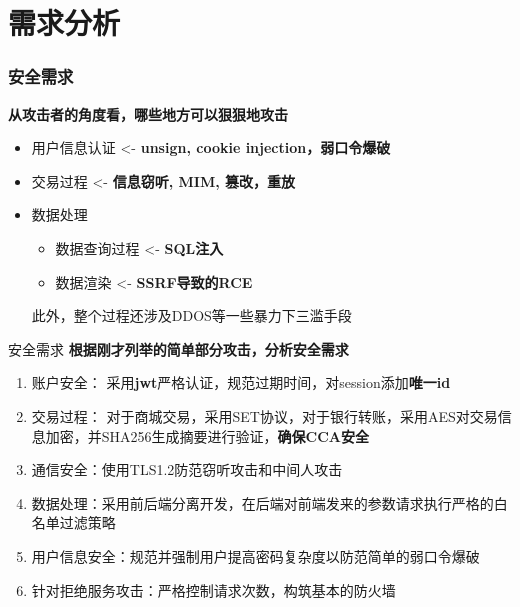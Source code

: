 \documentclass[]{beamer}
\begin{document}
    \section{需求分析}  
    \begin{frame}  
        \frametitle{安全需求} 
        \textbf{从攻击者的角度看，哪些地方可以狠狠地攻击}
        \begin{itemize}
            \item 用户信息认证 <- \textbf{unsign, cookie injection，弱口令爆破}
            \item 交易过程 <- \textbf{信息窃听, MIM, 篡改，重放}
            \item 数据处理
            \begin{itemize}
                \item 数据查询过程 <- \textbf{SQL注入}
                \item 数据渲染 <- \textbf{SSRF导致的RCE}
            \end{itemize}
            此外，整个过程还涉及DDOS等一些暴力下三滥手段
        \end{itemize}
    \end{frame}
    
    \begin{frame}{安全需求}
        \textbf{根据刚才列举的简单部分攻击，分析安全需求}
        \begin{enumerate}
            \item 账户安全： 采用\textbf{jwt}严格认证，规范过期时间，对session添加\textbf{唯一id}
            \item 交易过程： 对于商城交易，采用SET协议，对于银行转账，采用AES对交易信息加密，并SHA256生成摘要进行验证，\textbf{确保CCA安全}
            \item 通信安全：使用TLS1.2防范窃听攻击和中间人攻击
            \item 数据处理：采用前后端分离开发，在后端对前端发来的参数请求执行严格的白名单过滤策略
            \item 用户信息安全：规范并强制用户提高密码复杂度以防范简单的弱口令爆破
            \item 针对拒绝服务攻击：严格控制请求次数，构筑基本的防火墙
        \end{enumerate}
    \end{frame}
    
\end{document}

